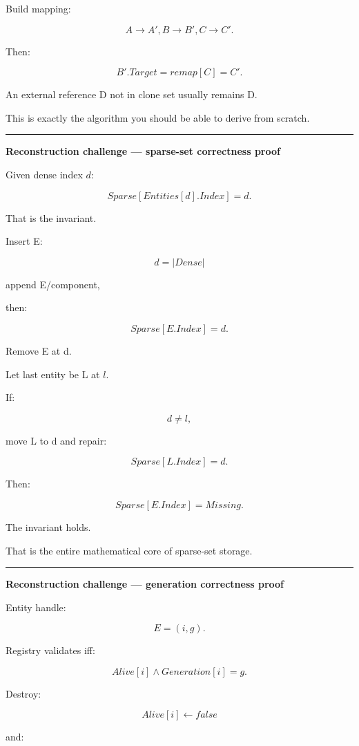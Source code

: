 Build mapping:

\[
A\rightarrow A',
B\rightarrow B',
C\rightarrow C'.
\]

Then:

\[
B'.Target
=
remap[C]
=
C'.
\]

An external reference D not in clone set usually remains D.

This is exactly the algorithm you should be able to derive from scratch.

\begin{center}\rule{0.5\linewidth}{0.5pt}\end{center}

\textbf{Reconstruction challenge --- sparse-set correctness proof}

Given dense index \(d\):

\[
Sparse[Entities[d].Index]=d.
\]

That is the invariant.

Insert E:

\[
d=|Dense|
\]

append E/component,

then:

\[
Sparse[E.Index]=d.
\]

Remove E at d.

Let last entity be L at \(l\).

If:

\[
d\neq l,
\]

move L to d and repair:

\[
Sparse[L.Index]=d.
\]

Then:

\[
Sparse[E.Index]=Missing.
\]

The invariant holds.

That is the entire mathematical core of sparse-set storage.

\begin{center}\rule{0.5\linewidth}{0.5pt}\end{center}

\textbf{Reconstruction challenge --- generation correctness proof}

Entity handle:

\[
E=(i,g).
\]

Registry validates iff:

\[
Alive[i]
\land
Generation[i]=g.
\]

Destroy:

\[
Alive[i]\leftarrow false
\]

and:

